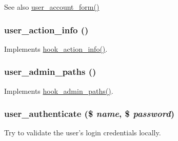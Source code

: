 \begin{DoxySeeAlso}{See also}
\hyperlink{user_8module_ab51965add9fd8ee2915e65d39213d05c}{user\_\-account\_\-form()} 
\end{DoxySeeAlso}
\hypertarget{user_8module_a804c5206067117643c1853f3e28bb208}{
\subsubsection[{user\_\-action\_\-info}]{\setlength{\rightskip}{0pt plus 5cm}user\_\-action\_\-info ()}}
\label{user_8module_a804c5206067117643c1853f3e28bb208}
Implements \hyperlink{group__actions_ga3df26c5d6496c91fcd0edd8648023fb4}{hook\_\-action\_\-info()}. \hypertarget{user_8module_a9896eb1c67550e111cd5aa5198a1abc0}{
\subsubsection[{user\_\-admin\_\-paths}]{\setlength{\rightskip}{0pt plus 5cm}user\_\-admin\_\-paths ()}}
\label{user_8module_a9896eb1c67550e111cd5aa5198a1abc0}
Implements \hyperlink{group__hooks_ga3fe6d93afc8bb04afbd9e3c326d1bdc1}{hook\_\-admin\_\-paths()}. \hypertarget{user_8module_a741745e553ff115eb51b4dcc8af1ffbc}{
\subsubsection[{user\_\-authenticate}]{\setlength{\rightskip}{0pt plus 5cm}user\_\-authenticate (\$ {\em name}, \/  \$ {\em password})}}
\label{user_8module_a741745e553ff115eb51b4dcc8af1ffbc}
Try to validate the user's login credentials locally.



